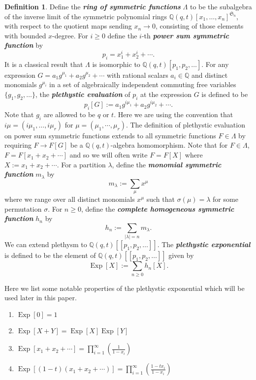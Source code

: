 \documentclass[11pt]{article}
\theoremstyle{definition}
\newtheorem{defi}[theo]{Definition}
\numberwithin{equation}{section}
\DeclareMathOperator{\EXP}{\mathrm{Exp}}
\begin{document}
 \begin{defi}\label{sym functions defn}
 Define the \textbf{\textit{ring of symmetric functions}} $\Lambda$ to be the subalgebra of the inverse limit of the symmetric polynomial rings $\mathbb{Q}(q,t)[x_1,\ldots,x_n]^{\mathfrak{S}_n}$, with respect to the quotient maps sending $x_n \rightarrow 0$, consisting of those elements with bounded $x$-degree. For $i \geq 0$ define the $i$-th \textbf{\textit{power sum symmetric function}} by
 $$p_i = x_1^i + x_2^i + \cdots .$$ It is a classical result that $\Lambda$ is isomorphic to $\mathbb{Q}(q,t)[p_1,p_2,\ldots]$. For any expression $G = a_1g^{\mu_1} + a_2g^{\mu_2} +\cdots$ with rational scalars $a_i \in \mathbb{Q}$ and distinct monomials $g^{\mu_i}$ in a set of algebraically independent commuting free variables $\{g_1,g_2,\ldots\}$, the \textbf{\textit{plethystic evaluation}} of $p_i$ at the expression $G$ is defined to be $$p_i[G] := a_1g^{i\mu_1} +a_2g^{i \mu_2}+ \cdots .$$ Note that $g_i$ are allowed to be $q$ or $t.$ Here we are using the convention that $i\mu = (i\mu_1,\ldots, i \mu_r)$ for $\mu = (\mu_1,\cdots, \mu_r).$ The definition of plethystic evaluation on power sum symmetric functions extends to all symmetric functions $F \in \Lambda$ by requiring $F \rightarrow F[G]$ be a $\mathbb{Q}(q,t)$-algebra homomorphism. Note that for $F \in \Lambda$, $F = F[x_1+x_2+ \cdots]$ and so we will often write $F = F[X]$ where $X:= x_1+ x_2 + \cdots.$ For a partition $\lambda$, define the \textbf{\textit{monomial symmetric function}} $m_\lambda$ by 
 $$m_\lambda := \sum_{\mu} x^{\mu}$$
 where we range over all distinct monomials $x^{\mu}$ such that $\sigma(\mu) = \lambda$ for some permutation $\sigma$. For $n \geq 0$, define the \textbf{\textit{complete homogeneous symmetric function}} $h_n$ by 
 $$h_n:= \sum_{|\lambda|= n} m_\lambda .$$ We can extend plethysm to $\mathbb{Q}(q,t)[[p_1,p_2,\ldots]]$.  The \textbf{\textit{plethystic exponential}} is defined to be the element of $\mathbb{Q}(q,t)[[p_1,p_2,\ldots]]$ given by 
 $$\EXP[X]:= \sum_{n \geq 0} h_n[X].$$ 
 \end{defi}


Here we list some notable properties of the plethystic exponential which will be used later in this paper.

\begin{enumerate}
    \item $\EXP[0] = 1$
    \item $\EXP[X+Y]= \EXP[X]\EXP[Y]$
    \item $\EXP[x_1+x_2+\cdots] = \prod_{i=1}^{\infty} \left( \frac{1}{1-x_i} \right)$
    \item $\EXP[(1-t)(x_1+x_2+\cdots)] = \prod_{i=1}^{\infty} \left( \frac{1-tx_i}{1-x_i} \right)$
\end{enumerate}
\end{document}
